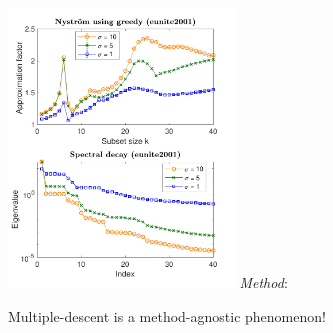 \documentclass{beamer}
\begin{document}
\begin{frame}
{{  \hspace{5mm}
  \includegraphics[width=0.45\textwidth]{../figs/nystrom/rbf-eunite2001-greedy}
}}
\emph{Method}: 

\begin{block}{}
\centering  Multiple-descent is a method-agnostic phenomenon!
  \end{block}
\end{frame}
\end{document}

